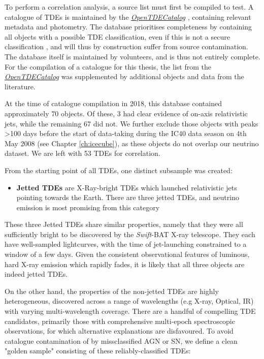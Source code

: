 To perform a correlation analysis, a source list must first be compiled to test. A catalogue of TDEs is maintained by the \emph{\href{https://tde.space/}{OpenTDECatalog}} , containing relevant metadata and photometry. The database prioritises completeness by containing all objects with a possible TDE classification, even if this is not a secure classification \cite{tde_catalog_paper}, and will thus by construction suffer from source contamination. The database itself is maintained by volunteers, and is thus not entirely complete. For the compilation of a catalogue for this thesis, the list from the \emph{\href{https://tde.space/}{OpenTDECatalog}} was supplemented by additional objects and data from the literature.

At the time of catalogue compilation in 2018, this database contained approximately 70 objects. Of these, 3 had clear evidence of on-axis relativistic jets, while the remaining 67 did not. We further exclude those objects with peaks >100 days before the start of data-taking during the IC40 data season on 4th May 2008 (see Chapter \ref{ch:icecube}), as these objects do not overlap our neutrino dataset. We are left with 53 TDEs for correlation.

From the starting point of all TDEs, one distinct subsample was created:

\begin{itemize}
	\item \textbf{Jetted TDEs} are X-Ray-bright TDEs which launched relativistic jets pointing towards the Earth. There are three jetted TDEs, and neutrino emission is most promising from this category
\end{itemize}

These three Jetted TDEs share similar properties, namely that they were all sufficiently bright to be discovered by the \textit{Swift}-BAT X-ray telescope. They each have well-sampled lightcurves, with the time of jet-launching constrained to a window of a few days. Given the consistent observational features of luminous, hard X-ray emission which rapidly fades, it is likely that all three objects are indeed jetted TDEs.

On the other hand, the properties of the non-jetted TDEs are highly heterogeneous, discovered across a range of wavelengths (e.g X-ray, Optical, IR) with varying multi-wavelength coverage. There are a handful of compelling TDE candidates, primarily those with comprehensive multi-epoch spectroscopic observations, for which alternative explanations are disfavoured. To avoid catalogue contamination of by missclassified AGN or SN, we define a clean "golden sample" consisting of these reliably-classified TDEs:

